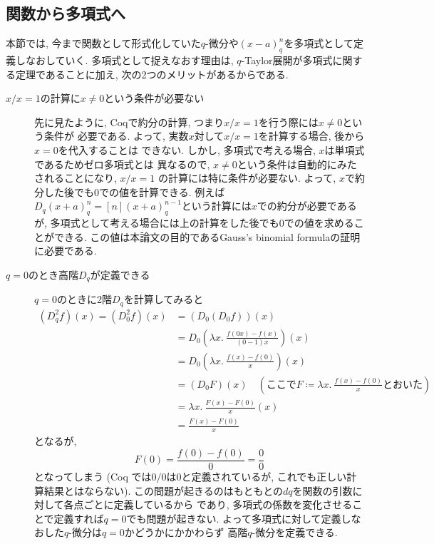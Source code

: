 \documentclass[11pt]{jsreport}
\theoremstyle{mystyle}
\newcommand{\0}{\textbf{0}}
\newcommand{\1}{\textbf{1}}
\newcommand{\2}{\textbf{2}}
\begin{document}
\subsection{関数から多項式へ} \label{ssec poly}
本節では, 今まで関数として形式化していた$q$-微分や$(x - a)^n_q$を多項式として定義しなおしていく. 多項式として捉えなおす理由は, $q$-Taylor展開が多項式に関する定理であることに加え, 次の2つのメリットがあるからである. 
\begin{description}
\item[$x / x = 1$の計算に$x \neq 0$という条件が必要ない]

  先に見たように, Coqで約分の計算, つまり$x / x = 1$を行う際には$x \ne 0$という条件が
  必要である. よって, 実数$x$対して$x / x = 1$を計算する場合, 後から$x = 0$を代入することは
  できない.   しかし, 多項式で考える場合, $x$は単項式であるためゼロ多項式とは
  異なるので, $x \neq 0$という条件は自動的にみたされることになり, $x / x = 1$
  の計算には特に条件が必要ない. よって, $x$で約分した後でも$0$での値を計算できる.  
  例えば$D_q (x + a)^n_q = [n](x + a)^{n - 1}_q$という計算には$x$での約分が必要であるが, 
  多項式として考える場合には上の計算をした後でも$0$での値を求めることができる. 
  この値は本論文の目的であるGauss's binomial formulaの証明に必要である. 
\item[$q = 0$のとき高階$D_q$が定義できる]

	$q = 0$のときに2階$D_q$を計算してみると
	\begin{align*}
	  (D_q ^2 f) (x) = (D_0 ^2 f) (x) &= (D_0 (D_0 f)) (x) \\
	                    &= D_0 \left( \lambda x.\ \frac{f (0 x) - f(x)}{(0 - 1)x} \right) (x) \\
	                    &= D_0 \left( \lambda x.\ \frac{f(x) - f(0)}{x} \right) (x) \\
	                    &= (D_0 F) (x)
	                      \quad (\text{ここで}F \coloneqq \lambda x.\ \frac{f(x) - f(0)}{x}
	                                \text{とおいた})\\
	                    &= \lambda x.\ \frac{F(x) - F(0)}{x} (x) \\
	                    &= \frac{F(x) - F(0)}{x}
	\end{align*}
	となるが, 
	\[
	  F(0) = \frac{f(0) - f(0)}{0} = \frac{0}{0}
	\]
	となってしまう
	(Coq では$0/0$は$0$と定義されているが, これでも正しい計算結果とはならない).
	この問題が起きるのはもともとの$dq$を関数の引数に対して各点ごとに定義しているから
	であり, 多項式の係数を変化させることで定義すれば$q = 0$でも問題が起きない. 
	よって多項式に対して定義しなおした$q$-微分は$q = 0$かどうかにかかわらず
	高階$q$-微分を定義できる. 
\end{description}
\end{document}
